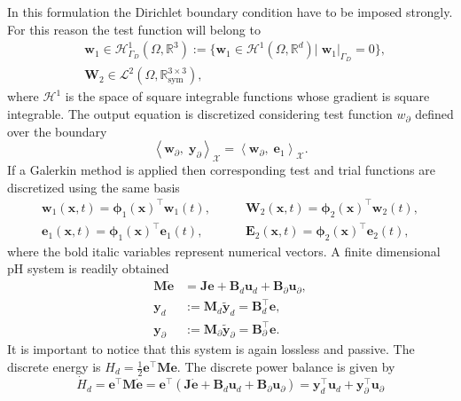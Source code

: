 \documentclass{svjour3}                     %
\begin{document}
In this formulation the Dirichlet boundary condition have to be imposed strongly. For this reason the test function will belong to
\begin{align*}
	&\bm{w}_1 \in \mathscr{H}^1_{\Gamma_D}(\Omega, \mathbb{R}^3) := \{\bm{w}_1 \in \mathscr{H}^1(\Omega, \mathbb{R}^d)|\;  \bm{w}_1|_{\Gamma_D} = 0  \}, \\
	&\bm{W}_2 \in \mathscr{L}^2(\Omega, \mathbb{R}^{3\times 3}_{\text{sym}}),
\end{align*} 
where $\mathscr{H}^1$ is the space of square integrable functions whose gradient is square integrable. The output equation is discretized considering test function $w_\partial$ defined over the boundary
\begin{equation}
\left\langle \bm{w}_\partial, \; \bm{y}_\partial \right\rangle_{\mathscr{X}} = \left\langle \bm{w}_\partial, \; \bm{e}_1 \right\rangle_{\mathscr{X}}.
\end{equation}
If a Galerkin method is applied then corresponding test and trial functions are discretized using the same basis
\begin{equation*}
\begin{aligned}
\bm{w}_1(\bm{x},t) = \bm{\phi}_1(\bm{x})^\top \mathbf{w}_1(t), \\
\bm{e}_1(\bm{x},t) = \bm{\phi}_1(\bm{x})^\top \mathbf{e}_1(t), 
\end{aligned} \qquad
\begin{aligned}
\bm{W}_2(\bm{x},t) = \bm{\phi}_2(\bm{x})^\top \mathbf{w}_2(t), \\
\bm{E}_2(\bm{x},t) = \bm{\phi}_2(\bm{x})^\top \mathbf{e}_2(t),
\end{aligned}
\end{equation*}
where the bold italic variables represent numerical vectors. A finite dimensional pH system is readily obtained
\begin{equation}
\begin{aligned}
\mathbf{M} \dot{\bm{e}} &= \mathbf{J} \mathbf{e} + \mathbf{B}_d \mathbf{u}_d + \mathbf{B}_\partial \mathbf{u}_\partial, \\
\mathbf{y}_d &:= \mathbf{M}_d \widetilde{\mathbf{y}}_d = \mathbf{B}_d^\top \mathbf{e},  \\
\mathbf{y}_\partial &:= \mathbf{M}_\partial \widetilde{\mathbf{y}}_\partial = \mathbf{B}_\partial^\top \mathbf{e}.
\end{aligned}
\end{equation}
It is important to notice that this system is again lossless and passive. The discrete energy is $H_d = \frac{1}{2} \mathbf{e}^\top \mathbf{M} \mathbf{e}$.
The discrete power balance is given by
\begin{equation*}
\dot{H}_d = \mathbf{e}^\top \mathbf{M} \dot{\mathbf{e}} = \mathbf{e}^\top ( \mathbf{J} \dot{\mathbf{e}} + \mathbf{B}_d \mathbf{u}_d + \mathbf{B}_\partial \mathbf{u}_\partial) = \mathbf{y}_d^\top \mathbf{u}_d + \mathbf{y}_\partial^\top \mathbf{u}_\partial 
\end{equation*}
\end{document}

